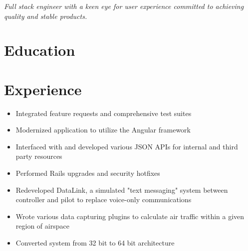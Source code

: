 \documentclass[10.5pt,a4paper,sans]{moderncv}        %
\begin{document}
\makecvtitle
\vspace*{-10mm}

\begin{center}
\emph{Full stack engineer with a keen eye for user experience committed to achieving quality and stable products.}
\end{center}


\section{Education}


\section{Experience}

\begin{itemize}
\item Integrated feature requests and comprehensive test suites
\item Modernized application to utilize the Angular framework
\item Interfaced with and developed various JSON APIs for internal and third party resources
\item Performed Rails upgrades and security hotfixes
\end{itemize}


\begin{itemize}
\item Redeveloped DataLink, a simulated "text messaging" system between controller and pilot to replace voice-only communications
\item Wrote various data capturing plugins to calculate air traffic within a given region of airspace
\item Converted system from 32 bit to 64 bit architecture
\end{itemize}

\end{document}
